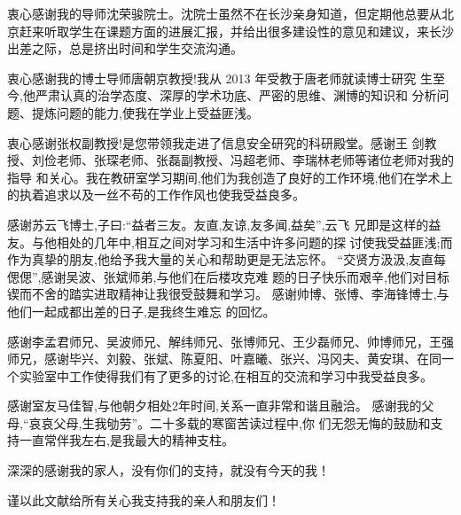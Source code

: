 

\begin{ack}
  
  衷心感谢我的导师沈荣骏院士。沈院士虽然不在长沙亲身知道，但定期他总要从北京赶来听取学生在课题方面的进展汇报，并给出很多建设性的意见和建议，来长沙出差之际，总是挤出时间和学生交流沟通。
  
  衷心感谢我的博士导师唐朝京教授!我从 2013 年受教于唐老师就读博士研究
  生至今,他严肃认真的治学态度、深厚的学术功底、严密的思维、渊博的知识和
  分析问题、提炼问题的能力,使我在学业上受益匪浅。
  
  衷心感谢张权副教授!是您带领我走进了信息安全研究的科研殿堂。感谢王
  剑教授、刘俭老师、张琛老师、张磊副教授、冯超老师、李瑞林老师等诸位老师对我的指导
  和关心。我在教研室学习期间,他们为我创造了良好的工作环境,他们在学术上
  的执着追求以及一丝不苟的工作作风也使我受益良多。
  
  感谢苏云飞博士,子曰:“益者三友。友直,友谅,友多闻,益矣”,云飞
  兄即是这样的益友。与他相处的几年中,相互之间对学习和生活中许多问题的探
  讨使我受益匪浅;而作为真挚的朋友,他给予我大量的关心和帮助更是无法忘怀。
  “交贤方汲汲,友直每偲偲”,感谢吴波、张斌师弟,与他们在后楼攻克难
  题的日子快乐而艰辛,他们对目标锲而不舍的踏实进取精神让我很受鼓舞和学习。
  感谢帅博、张博、李海锋博士,与他们一起成都出差的日子,是我终生难忘
  的回忆。
  
  感谢李孟君师兄、吴波师兄、解纬师兄、张博师兄、王少磊师兄、帅博师兄，王强师兄，感谢毕兴、刘毅、张斌、陈夏阳、叶嘉曦、张兴、冯冈夫、黄安琪、在同一个实验室中工作使得我们有了更多的讨论,在相互的交流和学习中我受益良多。
  
  感谢室友马佳智,与他朝夕相处2年时间,关系一直非常和谐且融洽。
  感谢我的父母,“哀哀父母,生我劬劳”。二十多载的寒窗苦读过程中,你
  们无怨无悔的鼓励和支持一直常伴我左右,是我最大的精神支柱。
  
  深深的感谢我的家人，没有你们的支持，就没有今天的我！
  
  谨以此文献给所有关心我支持我的亲人和朋友们！

\end{ack}

